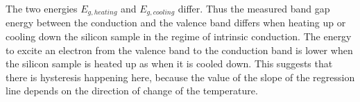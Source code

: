 \documentclass[a4paper]{article}
\begin{document}
The two energies $E_{g,heating}$ and $E_{g,cooling}$ differ. Thus the measured band gap energy between the conduction and the valence band differs when heating up or cooling down the silicon sample in the regime of intrinsic conduction. The energy to excite an electron from the valence band to the conduction band is lower when the silicon sample is heated up as when it is cooled down. This suggests that there is hysteresis happening here, because the value of the slope of the regression line depends on the direction of change of the temperature.

\end{document}

